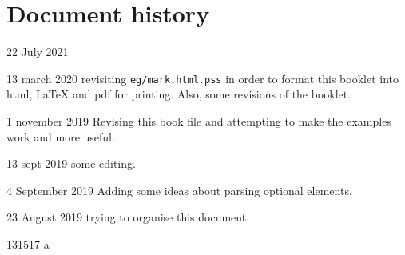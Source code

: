 \documentclass[a4paper,12pt]{article}
\begin{document}
\section{Document history}

 22 July 2021
    
 13 march 2020
   revisiting \texttt{eg/mark.html.pss} in order to format this booklet
   into html, \LaTeX{} and pdf for printing. Also, some revisions of
   the booklet.

 1 november 2019
   Revising this book file and attempting to make the examples
   work and more useful.

 13 sept 2019
   some editing.

 4 September 2019
   Adding some ideas about parsing optional elements.

 23 August 2019
   trying to organise this document.

 131517
 a
\end{document}
